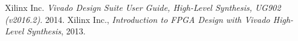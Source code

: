 \documentclass[paper=letter, fontsize=11.6pt]{scrartcl} %
\numberwithin{equation}{section} %
\numberwithin{figure}{section} %
\numberwithin{table}{section} %
\begin{document}
\begin{thebibliography}{9}

  Xilinx Inc. \emph{Vivado Design Suite User Guide, High-Level Synthesis, UG902 (v2016.2)}. 2014.
  Xilinx Inc., \emph{Introduction to FPGA Design with Vivado High-Level Synthesis}, 2013.

\end{thebibliography}
\end{document}

